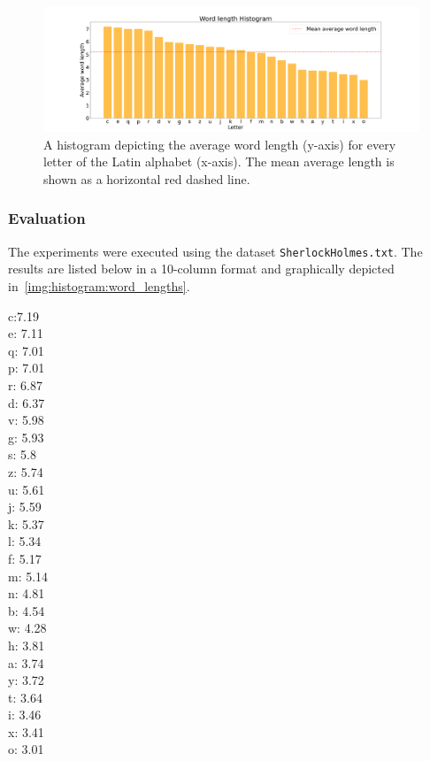 \documentclass[acmlarge]{acmart}
\begin{document}
  \begin{figure}[tb!]
    \centering
    \includegraphics[width=\linewidth]{figures/download}
    \caption{A histogram depicting the average word length (y-axis) for every letter of the Latin alphabet (x-axis). The mean average length is shown as a horizontal red dashed line.}
    \label{img:histogram:word_lengths}
  \end{figure}
  

  \subsubsection{Evaluation}
  The experiments were executed using the dataset \texttt{SherlockHolmes.txt}. The results are listed below in a 10-column format and graphically depicted in~\autoref{img:histogram:word_lengths}.

  \begin{multicols}{10}
    \noindent
    c:7.19
    \\ e: 7.11
    \\ q: 7.01
    \\ p: 7.01
    \\ r: 6.87
    \\ d: 6.37
    \\ v: 5.98
    \\ g: 5.93
    \\ s: 5.8
    \\ z: 5.74
    \\ u: 5.61
    \\ j: 5.59
    \\ k: 5.37
    \\ l: 5.34
    \\ f: 5.17
    \\ m: 5.14
    \\ n: 4.81
    \\ b: 4.54
    \\ w: 4.28
    \\ h: 3.81
    \\ a: 3.74
    \\ y: 3.72
    \\ t: 3.64
    \\ i: 3.46
    \\ x: 3.41
    \\ o: 3.01
    \label{multicol:test}
  \end{multicols}
\end{document}
